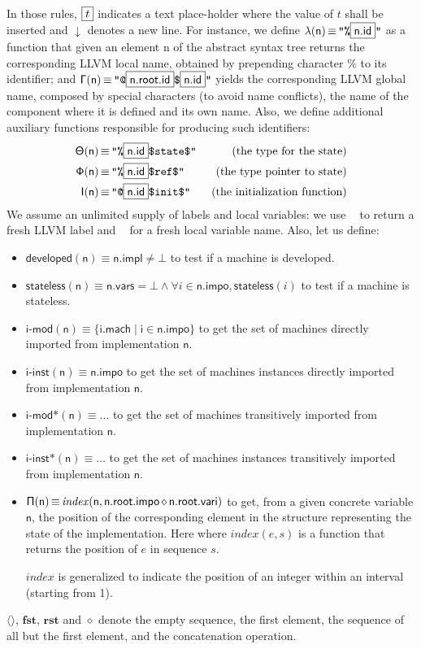 \documentclass{article}
\newcommand{\nl}[0]{\ensuremath{\downarrow}}
\DeclareMathOperator{\conc}{\diamond}
\DeclareMathOperator{\isdef}{\equiv}
\DeclareMathOperator{\lbl}{\mathcal{L}()}
\DeclareMathOperator{\variable}{\mathcal{V}()}
\newcommand{\llvm}[1]{\texttt{#1}}
\newcommand{\B}[1]{\textsf{#1}}
\newcommand{\PH}[1]{\framebox{$#1$}}
\newcommand{\Global}[0]{\ensuremath{\sf\Gamma}}
\newcommand{\local}[0]{\ensuremath{\sf\lambda}}
\newcommand{\developed}[0]{\ensuremath{\textsf{developed}}}
\newcommand{\stateless}[0]{\ensuremath{\textsf{stateless}}}
\newcommand{\importedmodules}[0]{\ensuremath{\textsf{i-mod}}}
\newcommand{\trimportedmodules}[0]{\ensuremath{\textsf{i-mod$\mathsf{\ast}$}}}
\newcommand{\importedinstances}[0]{\ensuremath{\textsf{i-inst}}}
\newcommand{\trimportedinstances}[0]{\ensuremath{\textsf{i-inst$\mathsf{\ast}$}}}
\newcommand{\idx}[0]{\ensuremath{\sf\Pi}}
\newcommand{\state}[0]{\ensuremath{\sf\Theta}}
\newcommand{\stateref}[0]{\ensuremath{\sf\Phi}}
\newcommand{\init}[0]{\ensuremath{\mathsf{I}}}
\begin{document}
In those rules, $\PH{t}$ indicates a text place-holder where the value of $t$
shall be inserted and $\nl$ denotes a new line. For instance, we define
$\local(\B{n}) \isdef \llvm{"\%\PH{\B{n.id}}"}$ as a function that given an
element \B{n} of the abstract syntax tree returns the corresponding LLVM local
name, obtained by prepending character \% to its identifier; and $\Global(\B{n})
\isdef \llvm{"@\PH{\B{n.root.id}}\$\PH{\B{n.id}}"}$ yields the corresponding
LLVM global name, composed by special characters (to avoid name conflicts), the
name of the component where it is defined and its own name.  Also, we define
additional auxiliary functions responsible for producing such identifiers:
\begin{align*}
\state(\B{n}) & \isdef \llvm{"\%\PH{\B{n.id}}\$state\$"} & \text{ (the type for the state)} \\
\stateref(\B{n}) & \isdef \llvm{"\%\PH{\B{n.id}}\$ref\$"} & \text{ (the type pointer to state)} \\
\init(\B{n}) & \isdef \llvm{"@\PH{\B{n.id}}\$init\$"} & \text{ (the initialization function)}
\end{align*}
We assume an unlimited supply of labels and local variables: we use $\lbl$ to
return a fresh LLVM label and $\variable$ for a fresh local variable name. Also, let us define:
\begin{itemize}
\item $\developed(\B{n}) \isdef \B{n.impl} \neq \bot$ to test if a machine is
  developed.
\item $\stateless(\B{n}) \isdef \B{n.vars} =  \bot \land \forall i \in \B{n.impo}, \stateless(i)$ to test if a machine is stateless.
\item $\importedmodules(\B{n}) \isdef \{ \B{i.mach} \mid \B{i} \in \B{n.impo}
  \}$ to get the set of machines directly imported from implementation $\B{n}$.
\item $\importedinstances(\B{n}) \isdef \B{n.impo}$ to get the set of machines
  instances directly imported from implementation $\B{n}$.
\item $\trimportedmodules(\B{n}) \isdef \ldots$ to get the set of machines
transitively imported from implementation $\B{n}$.
\item $\trimportedinstances(\B{n}) \isdef \ldots$ to get the set of machines
instances transitively imported from implementation $\B{n}$.
\item $\idx(\B{n}) \isdef \mathit{index}(\B{n}, \B{n.root.impo} \conc
  \B{n.root.vari})$ to get, from a given concrete variable $\B{n}$,
  the position of the corresponding element in the structure
  representing the state of the implementation. Here where
  $\mathit{index}(e, s)$ is a function that returns the position of
  $e$ in sequence $s$. 

  $index$ is generalized to indicate the position of an integer within
  an interval (starting from 1).
\end{itemize}
\newcommand{\mtyseq}[0]{\ensuremath{\langle \rangle}}
\newcommand{\fst}[0]{\ensuremath{\mathbf{fst}}}
\newcommand{\rst}[0]{\ensuremath{\mathbf{rst}}} $\mtyseq$, $\fst$,
$\rst$ and $\conc$ denote the empty sequence, the first element, the
sequence of all but the first element, and the concatenation
operation.
\end{document}
